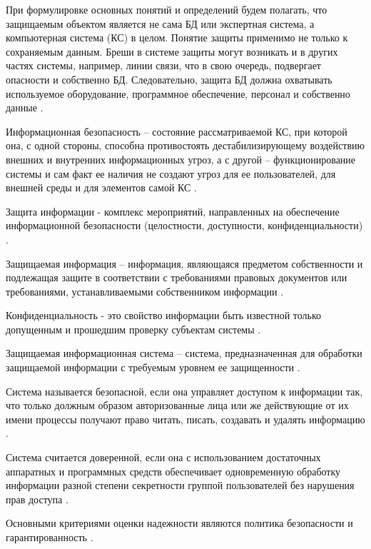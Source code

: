 При формулировке основных понятий и определений будем полагать, что защищаемым объектом является не сама БД или экспертная система, а компьютерная система (КС) в целом. Понятие защиты применимо не только к сохраняемым данным. Бреши в системе защиты могут возникать и в других частях системы, например, линии связи, что в свою очередь, подвергает опасности и собственно БД. Следовательно, защита БД должна охватывать используемое оборудование, программное обеспечение, персонал и собственно данные \autocite[сс. 15-18]{Skakun}. 

Информационная безопасность – состояние рассматриваемой КС, при которой она, с одной стороны, способна противостоять дестабилизирующему воздействию внешних и внутренних информационных угроз, а с другой – функционирование системы и сам факт ее наличия не создают угроз для ее пользователей, для внешней среды и для элементов самой КС \autocite[сс. 15-18]{Skakun}.

Защита информации - комплекс мероприятий, направленных на обеспечение информационной безопасности (целостности, доступности, конфиденциальности) \autocite[сс. 15-18]{Skakun}.

Защищаемая информация – информация, являющаяся предметом собственности и подлежащая защите в соответствии с требованиями правовых документов или требованиями, устанавливаемыми собственником информации \autocite[сс. 15-18]{Skakun}. 

Конфиденциальность - это свойство информации быть известной только допущенным и прошедшим проверку субъектам системы \autocite[сс. 15-18]{Skakun}.

Защищаемая информационная система – система, предназначенная для обработки защищаемой информации с требуемым уровнем ее защищенности \autocite[сс. 15-18]{Skakun}.

Система называется безопасной, если она управляет доступом к информации так, что только должным образом авторизованные лица или же действующие от их имени процессы получают право читать, писать, создавать и удалять информацию \autocite[сс. 15-18]{Skakun}. 

Система считается доверенной, если она с использованием достаточных аппаратных и программных средств обеспечивает одновременную обработку информации разной степени секретности группой пользователей без нарушения прав доступа \autocite[сс. 15-18]{Skakun}.

Основными критериями оценки надежности являются политика безопасности и гарантированность \autocite[сс. 15-18]{Skakun}.

